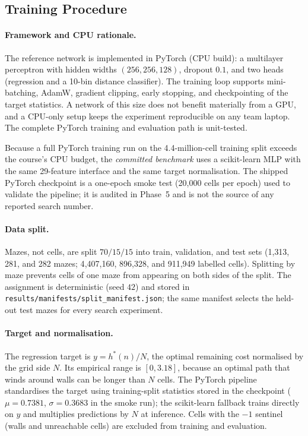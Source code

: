 
\subsection{Training Procedure}
\label{sec:phase3_training}

\paragraph{Framework and CPU rationale.}
The reference network is implemented in PyTorch (CPU build): a multilayer perceptron
with hidden widths $(256,256,128)$, dropout $0.1$, and two heads (regression and a
10-bin distance classifier). The training loop supports mini-batching, AdamW, gradient
clipping, early stopping, and checkpointing of the target statistics. A network of this
size does not benefit materially from a GPU, and a CPU-only setup keeps the experiment
reproducible on any team laptop. The complete PyTorch training and evaluation path is
unit-tested.

Because a full PyTorch training run on the 4.4-million-cell training split exceeds the
course's CPU budget, the \emph{committed benchmark} uses a scikit-learn MLP with the
same 29-feature interface and the same target normalisation. The shipped PyTorch
checkpoint is a one-epoch smoke test (20{,}000 cells per epoch) used to validate the
pipeline; it is audited in Phase~5 and is not the source of any reported search number.

\paragraph{Data split.}
Mazes, not cells, are split $70/15/15$ into train, validation, and test sets
(1{,}313, 281, and 282 mazes; 4{,}407{,}160, 896{,}328, and 911{,}949 labelled cells).
Splitting by maze prevents cells of one maze from appearing on both sides of the split.
The assignment is deterministic (seed $42$) and stored in
\texttt{results/manifests/split\_manifest.json}; the same manifest selects the held-out
test mazes for every search experiment.

\paragraph{Target and normalisation.}
The regression target is $y=h^\ast(n)/N$, the optimal remaining cost normalised by the
grid side $N$. Its empirical range is $[0,3.18]$, because an optimal path that winds
around walls can be longer than $N$ cells. The PyTorch pipeline standardises the target
using training-split statistics stored in the checkpoint
($\mu=0.7381$, $\sigma=0.3683$ in the smoke run); the scikit-learn fallback trains
directly on $y$ and multiplies predictions by $N$ at inference. Cells with the $-1$
sentinel (walls and unreachable cells) are excluded from training and evaluation.

